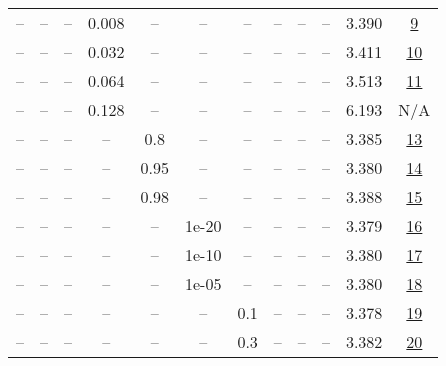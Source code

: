 \begin{table}[H]
\begin{tabular}{cccccccccccc}
-- & -- & -- & 0.008 & -- & -- & -- & -- & -- & -- & 3.390 & \href{https://wandb.ai/stanford-mercury/optimizer-scaling/runs/sweep-130m-5B-scion2dd269lr0.008-wd0.1-minlr0-warmup0-b10.95-gn1-d01816}{9} \\
-- & -- & -- & 0.032 & -- & -- & -- & -- & -- & -- & 3.411 & \href{https://wandb.ai/stanford-mercury/optimizer-scaling/runs/sweep-130m-5B-scion488fa3lr0.032-wd0.1-minlr0-warmup0-b10.95-gn1-e85b67}{10} \\
-- & -- & -- & 0.064 & -- & -- & -- & -- & -- & -- & 3.513 & \href{https://wandb.ai/stanford-mercury/optimizer-scaling/runs/sweep-130m-5B-scion540487lr0.064-wd0.1-minlr0-warmup0-b10.95-gn1-e6f899}{11} \\
-- & -- & -- & 0.128 & -- & -- & -- & -- & -- & -- & 6.193 & N/A \\
-- & -- & -- & -- & 0.8 & -- & -- & -- & -- & -- & 3.385 & \href{https://wandb.ai/stanford-mercury/optimizer-scaling/runs/sweep-130m-5B-scionfaeeb3lr0.016-wd0.1-minlr0-warmup0-b10.95-gn1-d985d7}{13} \\
-- & -- & -- & -- & 0.95 & -- & -- & -- & -- & -- & 3.380 & \href{https://wandb.ai/stanford-mercury/optimizer-scaling/runs/sweep-130m-5B-scionc0fc35lr0.016-wd0.1-minlr0-warmup0-b10.95-gn1-70508b}{14} \\
-- & -- & -- & -- & 0.98 & -- & -- & -- & -- & -- & 3.388 & \href{https://wandb.ai/stanford-mercury/optimizer-scaling/runs/sweep-130m-5B-scion382771lr0.016-wd0.1-minlr0-warmup0-b10.95-gn1-cad6c0}{15} \\
-- & -- & -- & -- & -- & 1e-20 & -- & -- & -- & -- & 3.379 & \href{https://wandb.ai/stanford-mercury/optimizer-scaling/runs/sweep-130m-5B-scion98431elr0.016-wd0.1-minlr0-warmup0-b10.95-gn1-1be7a9}{16} \\
-- & -- & -- & -- & -- & 1e-10 & -- & -- & -- & -- & 3.380 & \href{https://wandb.ai/stanford-mercury/optimizer-scaling/runs/sweep-130m-5B-scione949f4lr0.016-wd0.1-minlr0-warmup0-b10.95-gn1-de429b}{17} \\
-- & -- & -- & -- & -- & 1e-05 & -- & -- & -- & -- & 3.380 & \href{https://wandb.ai/stanford-mercury/optimizer-scaling/runs/sweep-130m-5B-scion39d339lr0.016-wd0.1-minlr0-warmup0-b10.95-gn1-f7a7f0}{18} \\
-- & -- & -- & -- & -- & -- & 0.1 & -- & -- & -- & 3.378 & \href{https://wandb.ai/stanford-mercury/optimizer-scaling/runs/sweep-130m-5B-scion0749aelr0.016-wd0.1-minlr0-warmup0-b10.95-gn1-9268f7}{19} \\
-- & -- & -- & -- & -- & -- & 0.3 & -- & -- & -- & 3.382 & \href{https://wandb.ai/stanford-mercury/optimizer-scaling/runs/sweep-130m-5B-scionecb2fclr0.016-wd0.1-minlr0-warmup0-b10.95-gn1-4bd5ef}{20} \\

\end{tabular}
\end{table}
